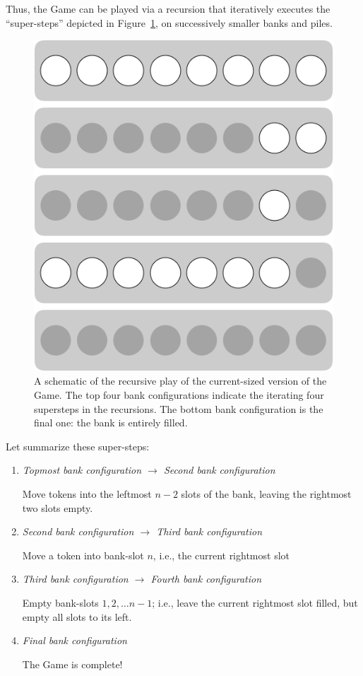 Thus, the Game can be played via a recursion that iteratively executes
the ``super-steps'' depicted in Figure~\ref{fig:jeujetonsPrinciple},
on successively smaller banks and piles.
\begin{figure}[htb]
\begin{center}
        \includegraphics[scale=0.3]{FiguresMaths/GameTokenPrinciple.png}
\caption{A schematic of the recursive play of the current-sized
  version of the Game.  The top four bank configurations indicate the
  iterating four supersteps in the recursions.  The bottom bank
  configuration is the final one: the bank is entirely filled. }
        \label{fig:jeujetonsPrinciple}
\end{center}
\end{figure}

Let summarize these super-steps:
\begin{enumerate}
\item
{\it Topmost bank configuration $\longrightarrow$ Second bank
  configuration}

Move tokens into the leftmost $n-2$ slots of the bank, leaving the
rightmost two slots empty.

\item
{\it Second bank configuration $\longrightarrow$ Third bank configuration}

Move a token into bank-slot $n$, i.e., the current rightmost slot

\item
{\it Third bank configuration $\longrightarrow$ Fourth bank configuration}

Empty  bank-slots $1, 2, \ldots n-1$; i.e., leave the current
rightmost slot filled, but empty all slots to its left.

\item
{\it Final bank configuration}

The Game is complete!
\end{enumerate}

